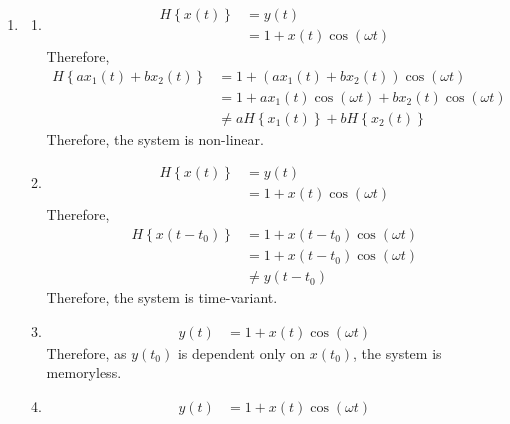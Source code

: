 \documentclass[fleqn, a4paper, 11pt, oneside]{amsart}
\theoremstyle{definition}
\theoremstyle{theorem}
\begin{document}
\begin{solution}
	\begin{enumerate}[leftmargin=*]
		\item
			\begin{enumerate}
				\item
					\begin{align*}
						H\left\{ x(t) \right\} & = y(t) \\
                                                                       & = 1 + x(t) \cos(\omega t)
					\end{align*}
					Therefore,
					\begin{align*}
						H\left\{ a x_1(t) + b x_2(t) \right\} & = 1 + \left( a x_1(t) + b x_2(t) \right) \cos(\omega t) \\
                                                                                      & = 1 + a x_1(t) \cos(\omega t) + b x_2(t) \cos(\omega t) \\
                                                                                      & \neq a H\left\{ x_1(t) \right\} + b H\left\{ x_2(t) \right\}
					\end{align*}
					Therefore, the system is non-linear.
				\item
					\begin{align*}
						H\left\{ x(t) \right\} & = y(t) \\
                                                                       & = 1 + x(t) \cos(\omega t)
					\end{align*}
					Therefore,
					\begin{align*}
						H\left\{ x(t - t_0) \right\} & = 1 + x(t - t_0) \cos(\omega t) \\
                                                                             & = 1 + x(t - t_0) \cos(\omega t) \\
                                                                             & \neq y(t - t_0)
					\end{align*}
					Therefore, the system is time-variant.
				\item
					\begin{align*}
						y(t) & = 1 + x(t) \cos(\omega t)
					\end{align*}
					Therefore, as $y(t_0)$ is dependent only on $x(t_0)$, the system is memoryless.
				\item
					\begin{align*}
						y(t) & = 1 + x(t) \cos(\omega t)
					\end{align*}

\end{enumerate}
\end{enumerate}
\end{solution}
\end{document}
